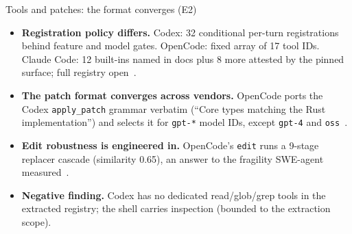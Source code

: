 \documentclass[aspectratio=169,11pt]{beamer}
\newcommand{\codex}[0]{Codex}
\newcommand{\occ}[0]{OpenCode}
\newcommand{\ccc}[0]{Claude Code}
\begin{document}
\begin{frame}{Tools and patches: the format converges (E2)}
  \begin{itemize}
    \item \textbf{Registration policy differs.} \codex{}: 32 conditional
      per-turn registrations behind feature and model gates. \occ{}:
      fixed array of 17 tool IDs. \ccc{}: 12 built-ins named in docs plus
      8 more attested by the pinned surface; full registry open~\citep{codexRepo,opencodeRepo,claudeCodeHooksDocs,claudeCodeSurface}.
    \item \textbf{The patch format converges across vendors.} \occ{}
      ports the \codex{} \texttt{apply\_patch} grammar verbatim (``Core
      types matching the Rust implementation'') and selects it for
      \texttt{gpt-*} model IDs, except \texttt{gpt-4} and
      \texttt{oss}~\citep{opencodeRepo}.
    \item \textbf{Edit robustness is engineered in.} \occ{}'s
      \texttt{edit} runs a 9-stage replacer cascade (similarity 0.65),
      an answer to the fragility SWE-agent measured~\citep{yang2024sweagent}.
    \item \textbf{Negative finding.} \codex{} has no dedicated
      read/glob/grep tools in the extracted registry; the shell carries
      inspection (bounded to the extraction scope).
  \end{itemize}
\end{frame}
\end{document}
